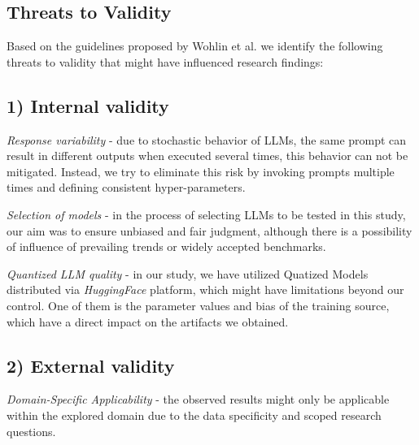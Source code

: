 \documentclass[conference]{IEEEtran}
\begin{document}

\subsection{Threats to Validity}

Based on the guidelines proposed by Wohlin et al. \cite{wohlin2012experimentation} we identify the following threats to validity that might have influenced research findings: 
\subsection*{\textbf{1) Internal validity}}
    \textit{Response variability }- due to stochastic behavior of LLMs, the same prompt can result in different outputs when executed several times, this behavior can not be mitigated. Instead, we try to eliminate this risk by invoking prompts multiple times and defining consistent hyper-parameters.
    
    \textit{Selection of models} - in the process of selecting LLMs to be tested in this study, our aim was to ensure unbiased and fair judgment, although there is a possibility of influence of prevailing trends or widely accepted benchmarks.
    
    \textit{Quantized LLM quality} - in our study, we have utilized Quatized Models distributed via \textit{HuggingFace} platform, which might have limitations beyond our control. One of them is the parameter values and bias of the training source, which have a direct impact on the artifacts we obtained.

\subsection*{\textbf{2) External validity}}
    
    \textit{Domain-Specific Applicability} - the observed results might only be applicable within the explored domain due to the data specificity and scoped research questions.
    
\end{document}
